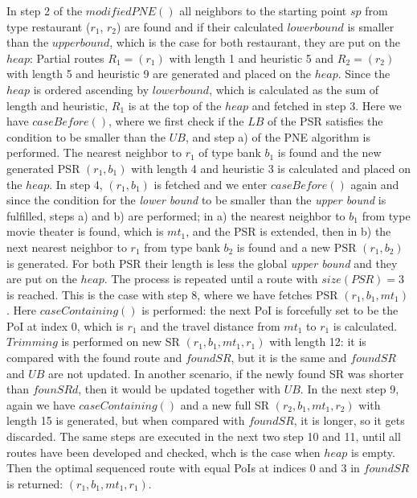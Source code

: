 In step 2 of the $modifiedPNE()$ all neighbors to the starting point $sp$ from type restaurant ($r_1$, $r_2$) are found and if their calculated $lower bound$ is smaller than the $upper bound$, which is the case for both restaurant, they are put on the $heap$: Partial routes $R_1 = (r_1)$ with length 1 and heuristic 5 and $R_2 = (r_2)$ with length 5 and heuristic 9 are generated and placed on the $heap$. Since the $heap$ is ordered ascending by $lower bound$, which is calculated as the sum of length and heuristic, $R_1$ is at the top of the $heap$ and fetched in step 3. Here we have $caseBefore()$, where we first check if the $LB$ of the PSR satisfies the condition to be smaller than the $UB$, and step a) of the PNE algorithm is performed. The nearest neighbor to $r_1$ of type bank $b_1$ is found and the new generated PSR $(r_1, b_1)$ with length 4 and heuristic 3 is calculated and placed on the $heap$. In step 4, $(r_1, b_1)$ is fetched and we enter $caseBefore()$ again and since the condition for the \textit{lower bound} to be smaller than the \textit{upper bound} is fulfilled, steps a) and b) are performed; in a) the nearest neighbor to $b_1$ from type movie theater is found, which is $mt_1$, and the PSR is extended, then in b) the next nearest neighbor to $r_1$ from type bank $b_2$ is found and a new PSR $(r_1, b_2)$ is generated. For both PSR their length is less the global \textit{upper bound} and they are put on the $heap$. The process is repeated until a route with $size(PSR) = 3$ is reached. This is the case with step 8, where we have fetches PSR $(r_1, b_1, mt_1)$. Here $caseContaining()$ is performed: the next PoI is forcefully set to be the PoI at index 0, which is $r_1$ and the travel distance from $mt_1$ to $r_1$ is calculated. $Trimming$ is performed on new SR $(r_1, b_1, mt_1, r_1)$ with length 12: it is compared with the found route and $foundSR$, but it is the same and $foundSR$ and $UB$ are not updated. In another scenario, if the newly found SR was shorter than $founSRd$, then it would be updated together with $UB$. In the next step 9, again we have $caseContaining()$ and a new full SR $(r_2, b_1, mt_1, r_2)$ with length 15 is generated, but when compared with $foundSR$, it is longer, so it gets discarded. The same steps are executed in the next two step 10 and 11, until all routes have been developed and checked, whch is the case when $heap$ is empty. Then the optimal sequenced route with equal PoIs at indices 0 and 3 in $foundSR$ is returned: $(r_1, b_1, mt_1, r_1)$.

